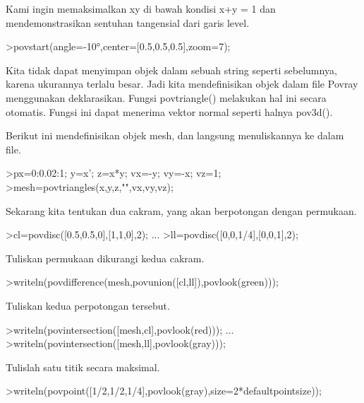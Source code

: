 \documentclass[12pt,arial,letterpaper]{book}
\begin{document}
\begin{eulernootebook}
\begin{eulercomment}
\begin{eulercomment}
\begin{eulernootebook}
\begin{eulercomment}
\begin{eulercomment}
\begin{eulercomment}
\begin{eulercomment}
\begin{eulercomment}
\begin{eulercomment}
\begin{eulercomment}
\begin{eulernotebook}
\begin{eulercomment}
Kami ingin memaksimalkan xy di bawah kondisi x+y = 1 dan
mendemonstrasikan sentuhan tangensial dari garis level.
\end{eulercomment}
\begin{eulerprompt}
>povstart(angle=-10°,center=[0.5,0.5,0.5],zoom=7);
\end{eulerprompt}
\begin{eulercomment}
Kita tidak dapat menyimpan objek dalam sebuah string seperti
sebelumnya, karena ukurannya terlalu besar. Jadi kita mendefinisikan
objek dalam file Povray menggunakan deklarasikan. Fungsi povtriangle()
melakukan hal ini secara otomatis. Fungsi ini dapat menerima vektor
normal seperti halnya pov3d().

Berikut ini mendefinisikan objek mesh, dan langsung menuliskannya ke
dalam file.
\end{eulercomment}
\begin{eulerprompt}
>px=0:0.02:1; y=x'; z=x*y; vx=-y; vy=-x; vz=1;
>mesh=povtriangles(x,y,z,"",vx,vy,vz);
\end{eulerprompt}
\begin{eulercomment}
Sekarang kita tentukan dua cakram, yang akan berpotongan dengan
permukaan.
\end{eulercomment}
\begin{eulerprompt}
>cl=povdisc([0.5,0.5,0],[1,1,0],2); ...
>ll=povdisc([0,0,1/4],[0,0,1],2);
\end{eulerprompt}
\begin{eulercomment}
Tuliskan permukaan dikurangi kedua cakram.
\end{eulercomment}
\begin{eulerprompt}
>writeln(povdifference(mesh,povunion([cl,ll]),povlook(green)));
\end{eulerprompt}
\begin{eulercomment}
Tuliskan kedua perpotongan tersebut.
\end{eulercomment}
\begin{eulerprompt}
>writeln(povintersection([mesh,cl],povlook(red))); ...
>writeln(povintersection([mesh,ll],povlook(gray)));
\end{eulerprompt}
\begin{eulercomment}
Tulislah satu titik secara maksimal.
\end{eulercomment}
\begin{eulerprompt}
>writeln(povpoint([1/2,1/2,1/4],povlook(gray),size=2*defaultpointsize));
\end{eulerprompt}
\begin{eulercomment}

\end{eulercomment}
\end{eulernotebook}
\end{eulercomment}
\end{eulercomment}
\end{eulercomment}
\end{eulercomment}
\end{eulercomment}
\end{eulercomment}
\end{eulercomment}
\end{eulernootebook}
\end{eulercomment}
\end{eulercomment}
\end{eulernootebook}
\end{document}
